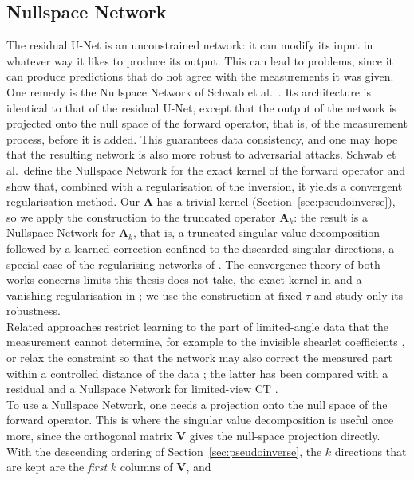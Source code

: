 \documentclass{article}
\numberwithin{equation}{section}
\begin{document}
\subsection{Nullspace Network}\label{sec:nsn}
The residual U-Net is an unconstrained network: it can modify its input in whatever way it likes to produce its output.
This can lead to problems, since it can produce predictions that do not agree with the measurements it was given.
One remedy is the Nullspace Network of Schwab et al.\ \parencite{NSL}. Its architecture is identical to that of the residual U-Net, except
that the output of the network is projected onto the null space of the forward operator, that is, of the measurement process, before it is added.
This guarantees data consistency, and one may hope that the resulting network is also more robust to adversarial attacks.
Schwab et al.\ define the Nullspace Network for the exact kernel of the forward operator and show that,
combined with a regularisation of the inversion, it yields a convergent regularisation method. Our
$\mathbf{A}$ has a trivial kernel (Section~\ref{sec:pseudoinverse}), so we apply the construction to
the truncated operator $\mathbf{A}_k$: the result is a Nullspace Network for $\mathbf{A}_k$, that is, a
truncated singular value decomposition followed by a learned correction confined to the discarded
singular directions, a special case of the regularising networks of \parencite{schwab2020bigjapan}. The
convergence theory of both works concerns limits this thesis does not take, the exact kernel in
\parencite{NSL} and a vanishing regularisation in \parencite{schwab2020bigjapan}; we use the
construction at fixed $\tau$ and study only its robustness.\\
Related approaches restrict learning to the part of limited-angle data that the measurement cannot determine, for example to
the invisible shearlet coefficients \parencite{bubba2019invisible}, or relax the constraint so that the network may also
correct the measured part within a controlled distance of the data \parencite{goeppel2023dataproximal}; the latter has been
compared with a residual and a Nullspace Network for limited-view CT \parencite{goeppel2025bvm}.\\
To use a Nullspace Network, one needs a projection onto the null space of the forward operator.
This is where the singular value decomposition is useful once more,
since the orthogonal matrix $\mathbf{V}$ gives the null-space projection directly.
With the descending ordering of Section~\ref{sec:pseudoinverse}, the $k$
directions that are kept are the \emph{first} $k$ columns of $\mathbf{V}$, and
\end{document}
